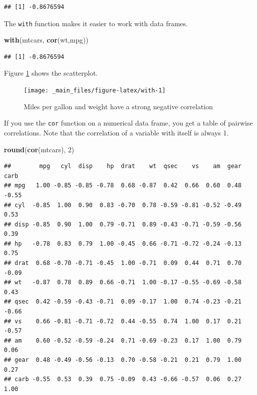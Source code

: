 \documentclass[
]{book}
\newenvironment{Shaded}{\begin{snugshade}}{\end{snugshade}}
\newcommand{\DecValTok}[1]{\textcolor[rgb]{0.00,0.00,0.81}{#1}}
\newcommand{\FunctionTok}[1]{\textcolor[rgb]{0.13,0.29,0.53}{\textbf{#1}}}
\newcommand{\NormalTok}[1]{#1}
\theoremstyle{definition}
\theoremstyle{definition}
\theoremstyle{definition}
\theoremstyle{definition}
\theoremstyle{remark}
\begin{document}
\begin{verbatim}
## [1] -0.8676594
\end{verbatim}

The \texttt{with} function makes it easier to work with data frames.

\begin{Shaded}
\begin{Highlighting}[]
\FunctionTok{with}\NormalTok{(mtcars, }\FunctionTok{cor}\NormalTok{(wt,mpg))}
\end{Highlighting}
\end{Shaded}

\begin{verbatim}
## [1] -0.8676594
\end{verbatim}

Figure \ref{fig:with} shows the scatterplot.

\begin{figure}

{\centering \texttt{[image: \_main\_files/figure-latex/with-1]} 

}

\caption{Miles per gallon and weight have a strong negative correlation}\label{fig:with}
\end{figure}

If you use the \texttt{cor} function on a numerical data frame, you get a table of pairwise correlations. Note that the correlation of a variable with itself is always 1.

\begin{Shaded}
\begin{Highlighting}[]
\FunctionTok{round}\NormalTok{(}\FunctionTok{cor}\NormalTok{(mtcars), }\DecValTok{2}\NormalTok{)}
\end{Highlighting}
\end{Shaded}

\begin{verbatim}
##        mpg   cyl  disp    hp  drat    wt  qsec    vs    am  gear  carb
## mpg   1.00 -0.85 -0.85 -0.78  0.68 -0.87  0.42  0.66  0.60  0.48 -0.55
## cyl  -0.85  1.00  0.90  0.83 -0.70  0.78 -0.59 -0.81 -0.52 -0.49  0.53
## disp -0.85  0.90  1.00  0.79 -0.71  0.89 -0.43 -0.71 -0.59 -0.56  0.39
## hp   -0.78  0.83  0.79  1.00 -0.45  0.66 -0.71 -0.72 -0.24 -0.13  0.75
## drat  0.68 -0.70 -0.71 -0.45  1.00 -0.71  0.09  0.44  0.71  0.70 -0.09
## wt   -0.87  0.78  0.89  0.66 -0.71  1.00 -0.17 -0.55 -0.69 -0.58  0.43
## qsec  0.42 -0.59 -0.43 -0.71  0.09 -0.17  1.00  0.74 -0.23 -0.21 -0.66
## vs    0.66 -0.81 -0.71 -0.72  0.44 -0.55  0.74  1.00  0.17  0.21 -0.57
## am    0.60 -0.52 -0.59 -0.24  0.71 -0.69 -0.23  0.17  1.00  0.79  0.06
## gear  0.48 -0.49 -0.56 -0.13  0.70 -0.58 -0.21  0.21  0.79  1.00  0.27
## carb -0.55  0.53  0.39  0.75 -0.09  0.43 -0.66 -0.57  0.06  0.27  1.00
\end{verbatim}
\end{document}
